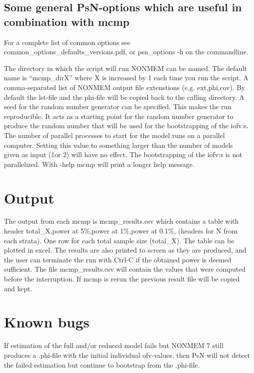 \subsection{Some general PsN-options which are useful in combination with mcmp}

For a complete list of common options see common\_options\_defaults\_versions.pdf, or psn\_options -h on the commandline.

\begin{optionlist}
The directory in which the script will run NONMEM can be named. The default name is “mcmp\_dirX” where X is increased by 1 each time you run the script. 
\nextopt
{}
A comma-separated list of NONMEM output file extenstions (e.g. ext,phi,cov). By default the lst-file and the phi-file will be copied back to the calling directory.
\nextopt
{}
A seed for the random number generator can be specified. This makes the run reproducible. It acts as a starting point for the random number generator to produce the random number that will be used for the bootstrapping of the iofv:s. 
\nextopt
{}
The number of parallel processes to start for the model runs on a parallel computer. Setting this value to something larger than the number of models given as input (1or 2) will have no effect. The bootstrapping of the iofv:s is not parallelized. 
\nextopt
{}
With -help mcmp will print a longer help message. 
\nextopt
\end{optionlist}

\section{Output}
The output from each mcmp is mcmp\_results.csv which contains a table with header total\_X,power at 5\%,power at 1\%,power at 0.1\%, (headers for N from each strata). One row for each total sample size (total\_X). The table can be plotted in excel. The results are also printed to screen as they are produced, and the user can terminate the run with Ctrl-C if the obtained power is deemed sufficient. The file mcmp\_results.csv will contain the values that were computed before the interruption. If mcmp is rerun the previous result file will be copied and kept.

\section{Known bugs}
If estimation of the full and/or reduced model fails but NONMEM 7 still produces a .phi-file with the initial individual ofv-values, then PsN will not detect the failed estimation but continue to bootstrap from the .phi-file.

